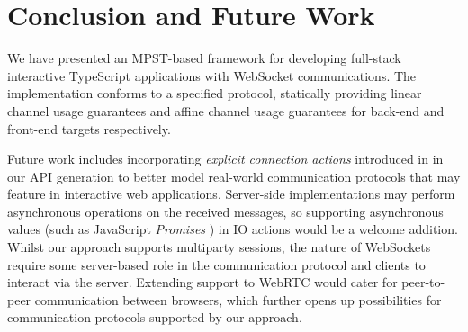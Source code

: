 \section{Conclusion and Future Work}
We have presented an MPST-based framework for developing full-stack interactive
TypeScript applications with WebSocket communications.
The implementation conforms to a specified
protocol, statically providing linear channel usage guarantees and affine
channel usage guarantees for back-end and front-end targets respectively.

Future work includes incorporating \textit{explicit connection actions}
introduced in \cite{ExplicitConnections} in our API generation to better model
real-world communication protocols that may feature in interactive web
applications.
Server-side implementations may perform asynchronous operations on the
received messages, so supporting asynchronous values (such as JavaScript
\textit{Promises} \cite{promise}) in IO actions would be a welcome addition.
Whilst our approach supports multiparty sessions, the nature of
WebSockets require some server-based role in the communication protocol and
clients to interact via the server.
Extending support to WebRTC \cite{WebRTC} would
cater for peer-to-peer communication between browsers, which further opens up
possibilities for communication protocols supported by our approach.


